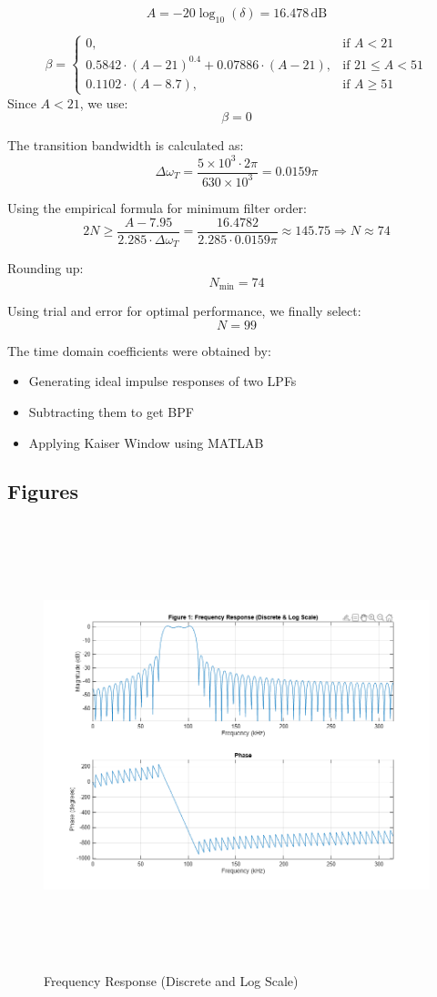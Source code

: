 \documentclass[12pt]{article}
\begin{document}
\[
A = -20 \log_{10}(\delta) = 16.478 \, \text{dB}
\]

\[
\beta =
\begin{cases}
0, & \text{if } A < 21 \\
0.5842 \cdot (A - 21)^{0.4} + 0.07886 \cdot (A - 21), & \text{if } 21 \leq A < 51 \\
0.1102 \cdot (A - 8.7), & \text{if } A \geq 51
\end{cases}
\]
Since \( A < 21 \), we use:
\[
\beta = 0
\]

The transition bandwidth is calculated as:
\[
\Delta \omega_T = \frac{5 \times 10^3 \cdot 2\pi}{630 \times 10^3} = 0.0159\pi
\]

Using the empirical formula for minimum filter order:
\[
2N \geq \frac{A - 7.95}{2.285 \cdot \Delta \omega_T} = \frac{16.4782}{2.285 \cdot 0.0159\pi} \approx 145.75 \Rightarrow N \approx 74
\]

Rounding up:
\[
N_{\text{min}} = 74
\]

Using trial and error for optimal performance, we finally select:
\[
N = 99
\]


The time domain coefficients were obtained by:
\begin{itemize}
    \item Generating ideal impulse responses of two LPFs
    \item Subtracting them to get BPF
    \item Applying Kaiser Window using MATLAB
\end{itemize}

\subsection{Figures}

\begin{figure}[H]
    \centering
    \includegraphics[height=13cm]{g11.png}
    \caption{Frequency Response (Discrete and Log Scale)}
    \label{fig:freq_response}
\end{figure}
\end{document}
